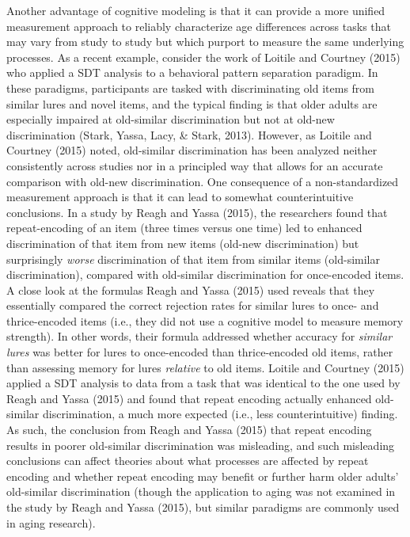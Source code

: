 \documentclass[
  english,
  ,man,floatsintext]{apa6}
\begin{document}
Another advantage of cognitive modeling is that it can provide a more unified measurement approach to reliably characterize age differences across tasks that may vary from study to study but which purport to measure the same underlying processes. As a recent example, consider the work of Loitile and Courtney (2015) who applied a SDT analysis to a behavioral pattern separation paradigm. In these paradigms, participants are tasked with discriminating old items from similar lures and novel items, and the typical finding is that older adults are especially impaired at old-similar discrimination but not at old-new discrimination (Stark, Yassa, Lacy, \& Stark, 2013). However, as Loitile and Courtney (2015) noted, old-similar discrimination has been analyzed neither consistently across studies nor in a principled way that allows for an accurate comparison with old-new discrimination. One consequence of a non-standardized measurement approach is that it can lead to somewhat counterintuitive conclusions. In a study by Reagh and Yassa (2015), the researchers found that repeat-encoding of an item (three times versus one time) led to enhanced discrimination of that item from new items (old-new discrimination) but surprisingly \emph{worse} discrimination of that item from similar items (old-similar discrimination), compared with old-similar discrimination for once-encoded items. A close look at the formulas Reagh and Yassa (2015) used reveals that they essentially compared the correct rejection rates for similar lures to once- and thrice-encoded items (i.e., they did not use a cognitive model to measure memory strength). In other words, their formula addressed whether accuracy for \emph{similar lures} was better for lures to once-encoded than thrice-encoded old items, rather than assessing memory for lures \emph{relative} to old items. Loitile and Courtney (2015) applied a SDT analysis to data from a task that was identical to the one used by Reagh and Yassa (2015) and found that repeat encoding actually enhanced old-similar discrimination, a much more expected (i.e., less counterintuitive) finding. As such, the conclusion from Reagh and Yassa (2015) that repeat encoding results in poorer old-similar discrimination was misleading, and such misleading conclusions can affect theories about what processes are affected by repeat encoding and whether repeat encoding may benefit or further harm older adults' old-similar discrimination (though the application to aging was not examined in the study by Reagh and Yassa (2015), but similar paradigms are commonly used in aging research).
\end{document}
